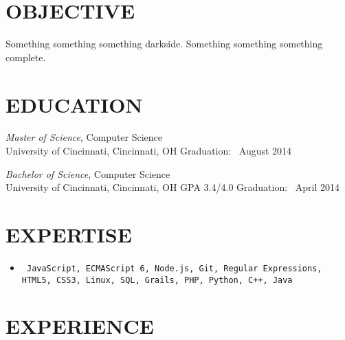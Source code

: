 \documentclass[11pt, line]{res}
\begin{document}
	\address{8228 Melrose Ln\\ Maineville, OH 45039\\ (513) 259-0656\\ ross@rhadden.com}

	\begin{resume}
		\section{OBJECTIVE}
			Something something something darkside.  Something something something complete.

		\section{EDUCATION}
			\textit{Master of Science},
				Computer Science \\
				University of Cincinnati, Cincinnati, OH
				\hfill Graduation: \ August 2014

			\textit{Bachelor of Science},
				Computer Science \\
				University of Cincinnati, Cincinnati, OH
				\hspace{0.2in} GPA 3.4/4.0
				\hfill Graduation: \ April 2014

		\section{EXPERTISE}
			\begin{itemize}
				\item[] \texttt{
					JavaScript,
					ECMAScript 6,
					Node.js,
					Git,
					Regular Expressions,
					HTML5,
					CSS3,
					Linux,
					SQL,
					Grails,
					PHP,
					Python,
					C++,
					Java
				}
			\end{itemize}

		\section{EXPERIENCE}
	\end{resume}
\end{document}
